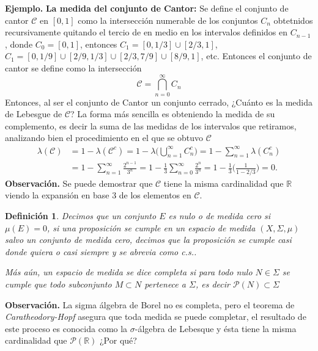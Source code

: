 \documentclass[letterpaper]{book}
\newtheorem{def.}{Definici\'on}[section]
\newcommand{\eje}{{\noindent \sc \textbf{Ejemplo. }}}
\newcommand{\obs}{{\noindent \sc \textbf{Observación. }}}
\newcommand{\sig}{\ensuremath{\Sigma}}
\newcommand{\re}{\ensuremath{\mathbb R }}
\begin{document}
\eje \textbf{La medida del conjunto de Cantor:} Se define el conjunto de cantor $\mathcal{C}$ en $[0,1]$ como la intersección numerable de los conjuntos $C_n$ obtetnidos recursivamente quitando el tercio de en medio en los intervalos definidos en $C_{n-1}$, donde $C_0=[0,1]$, entonces $C_1=[0,1/3]\cup[2/3,1]$, $C_1=[0,1/9]\cup[2/9,1/3]\cup[2/3,7/9]\cup[8/9,1]$, etc. Entonces el conjunto de cantor se define como la intersección
\[
\mathcal{C}=\bigcap_{n=0}^{\infty}C_n
\]
Entonces, al ser el conjunto de Cantor un conjunto cerrado, ¿Cuánto es la medida de Lebesgue de $\mathcal{C}$? La forma más sencilla es obteniendo la medida de su complemento, es decir la suma de las medidas de los intervalos que retiramos, analizando bien el procedimiento en el que se obtuvo $\mathcal{C}$
\begin{align*}
\lambda(\mathcal{C})&=1-\lambda(\mathcal{C}^c)=1-\lambda\Big(\bigcup_{n=1}^{\infty}C_n^c\Big)=1-\sum_{n=1}^{\infty}\lambda({C_n^c})\\
                    &=1-\sum_{n=1}^{\infty}\frac{2^{n-1}}{3^n}=1-\frac{1}{3}\sum_{n=0}^{\infty}\frac{2^{n}}{3^n}=1-\frac{1}{3}\Big(\frac{1}{1-2/3}\Big)=0.
\end{align*}
\obs Se puede demostrar que $\mathcal{C}$ tiene la misma cardinalidad que $\re$ viendo la expansión en base $3$ de los elementos en $\mathcal{C}$.
\begin{def.}
Decimos que un conjunto $E$ es \emph{nulo} o de medida cero si $\mu(E)=0$, si una proposición se cumple en un espacio de medida $(X,\sig,\mu)$ \emph{salvo} un conjunto de medida cero, decimos que la proposición se cumple \emph{casi donde quiera} o \emph{casi siempre} y se abrevia como c.s..

  Más aún, un espacio de medida se dice \emph{completa} si para todo nulo $N\in\sig$ se cumple que todo subconjunto $M\subset N$ pertenece a $\sig$, es decir $\mathcal{P}(N)\subset\sig$
\end{def.}
\obs La sigma álgebra de Borel no es completa, pero el teorema de \emph{Caratheodory-Hopf} asegura que toda medida se puede completar, el resultado de este proceso es conocida como la $\sigma$-álgebra de Lebesque y ésta tiene la misma cardinalidad que $\mathcal{P}(\re)$ ¿Por qué?
\end{document}
